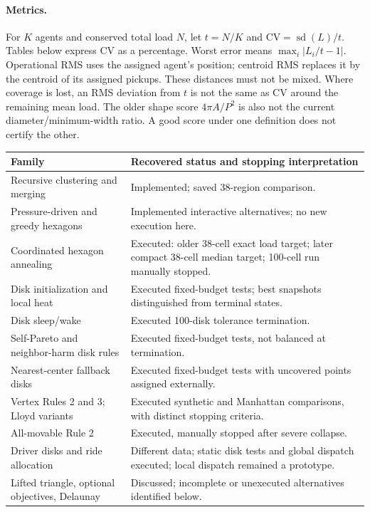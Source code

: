 \documentclass[11pt]{article}
\begin{document}
\paragraph{Metrics.}
For $K$ agents and conserved total load $N$, let $t=N/K$ and
$\mathrm{CV}=\operatorname{sd}(L)/t$. Tables below express CV as a percentage.
Worst error means $\max_i|L_i/t-1|$. Operational RMS uses the assigned agent's
position; centroid RMS replaces it by the centroid of its assigned pickups.
These distances must not be mixed. Where coverage is lost, an RMS deviation
from $t$ is not the same as CV around the remaining mean load.
The older shape score $4\pi A/P^2$ is also not the current diameter/minimum-width
ratio. A good score under one definition does not certify the other.

\begin{longtable}{p{.36\linewidth}p{.55\linewidth}}
\toprule Family & Recovered status and stopping interpretation\\\midrule
\endhead
Recursive clustering and merging & Implemented; saved 38-region comparison.\\
Pressure-driven and greedy hexagons & Implemented interactive alternatives; no new execution here.\\
Coordinated hexagon annealing & Executed: older 38-cell exact load target; later compact 38-cell median target; 100-cell run manually stopped.\\
Disk initialization and local heat & Executed fixed-budget tests; best snapshots distinguished from terminal states.\\
Disk sleep/wake & Executed 100-disk tolerance termination.\\
Self-Pareto and neighbor-harm disk rules & Executed fixed-budget tests, not balanced at termination.\\
Nearest-center fallback disks & Executed fixed-budget tests with uncovered points assigned externally.\\
Vertex Rules 2 and 3; Lloyd variants & Executed synthetic and Manhattan comparisons, with distinct stopping criteria.\\
All-movable Rule 2 & Executed, manually stopped after severe collapse.\\
Driver disks and ride allocation & Different data; static disk tests and global dispatch executed; local dispatch remained a prototype.\\
Lifted triangle, optional objectives, Delaunay & Discussed; incomplete or unexecuted alternatives identified below.\\
\bottomrule
\end{longtable}
\end{document}
